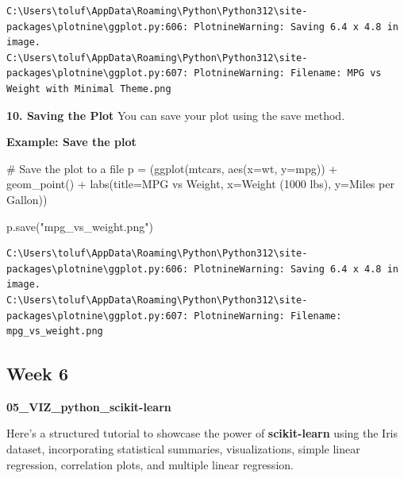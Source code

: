 \documentclass[
  letterpaper,
  DIV=11,
  numbers=noendperiod]{scrreprt}
\newenvironment{Shaded}{\begin{snugshade}}{\end{snugshade}}
\newcommand{\CommentTok}[1]{\textcolor[rgb]{0.37,0.37,0.37}{#1}}
\newcommand{\NormalTok}[1]{\textcolor[rgb]{0.00,0.23,0.31}{#1}}
\newcommand{\OperatorTok}[1]{\textcolor[rgb]{0.37,0.37,0.37}{#1}}
\newcommand{\StringTok}[1]{\textcolor[rgb]{0.13,0.47,0.30}{#1}}
\begin{document}
\begin{verbatim}
C:\Users\toluf\AppData\Roaming\Python\Python312\site-packages\plotnine\ggplot.py:606: PlotnineWarning: Saving 6.4 x 4.8 in image.
C:\Users\toluf\AppData\Roaming\Python\Python312\site-packages\plotnine\ggplot.py:607: PlotnineWarning: Filename: MPG vs Weight with Minimal Theme.png
\end{verbatim}

\textbf{10. Saving the Plot} You can save your plot using the save
method.

\textbf{Example: Save the plot}

\begin{Shaded}
\begin{Highlighting}[]
\CommentTok{\# Save the plot to a file}
\NormalTok{p }\OperatorTok{=}\NormalTok{ (ggplot(mtcars, aes(x}\OperatorTok{=}\StringTok{\textquotesingle{}wt\textquotesingle{}}\NormalTok{, y}\OperatorTok{=}\StringTok{\textquotesingle{}mpg\textquotesingle{}}\NormalTok{)) }\OperatorTok{+}
\NormalTok{     geom\_point() }\OperatorTok{+}
\NormalTok{     labs(title}\OperatorTok{=}\StringTok{\textquotesingle{}MPG vs Weight\textquotesingle{}}\NormalTok{,}
\NormalTok{          x}\OperatorTok{=}\StringTok{\textquotesingle{}Weight (1000 lbs)\textquotesingle{}}\NormalTok{,}
\NormalTok{          y}\OperatorTok{=}\StringTok{\textquotesingle{}Miles per Gallon\textquotesingle{}}\NormalTok{))}

\NormalTok{p.save(}\StringTok{"mpg\_vs\_weight.png"}\NormalTok{)}
\end{Highlighting}
\end{Shaded}

\begin{verbatim}
C:\Users\toluf\AppData\Roaming\Python\Python312\site-packages\plotnine\ggplot.py:606: PlotnineWarning: Saving 6.4 x 4.8 in image.
C:\Users\toluf\AppData\Roaming\Python\Python312\site-packages\plotnine\ggplot.py:607: PlotnineWarning: Filename: mpg_vs_weight.png
\end{verbatim}

\subsection{Week 6}\label{week-6}

\textbf{05\_VIZ\_python\_scikit-learn}

Here's a structured tutorial to showcase the power of
\textbf{scikit-learn} using the Iris dataset, incorporating statistical
summaries, visualizations, simple linear regression, correlation plots,
and multiple linear regression.
\end{document}
